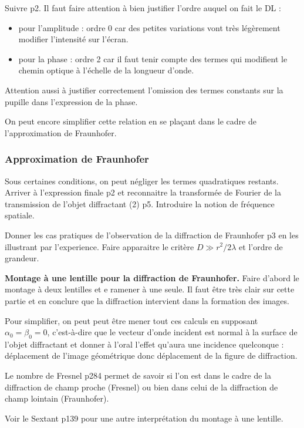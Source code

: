 Suivre \cite{Sayrin2019} p2.
Il faut faire attention à bien justifier l'ordre auquel on fait le DL :
\begin{itemize}
\item pour l'amplitude : ordre 0 car des petites variations vont très légèrement modifier l'intensité sur l'écran.
\item pour la phase : ordre 2 car il faut tenir compte des termes qui modifient le chemin optique à l'échelle de la longueur d'onde.
\end{itemize}
Attention aussi à justifier correctement l'omission des termes constants sur la pupille dans l'expression de la phase.

\begin{transition}
On peut encore simplifier cette relation en se plaçant dans le cadre de l'approximation de Fraunhofer.
\end{transition}

\subsubsection{Approximation de Fraunhofer}

Sous certaines conditions, on peut négliger les termes quadratiques restants.
Arriver à l'expression finale \cite{Sayrin2019} p2 et reconnaitre la transformée de Fourier de la transmission de l'objet diffractant \cite{Sayrin2019} (2) p5.
Introduire la notion de fréquence spatiale.

Donner les cas pratiques de l'observation de la diffraction de Fraunhofer \cite{Sayrin2019} p3 en les illustrant par l'experience.
Faire apparaitre le critère $D\gg r^2/2\lambda$ et l'ordre de grandeur.

\begin{experience}
\textbf{Montage à une lentille pour la diffraction de Fraunhofer.}
Faire d'abord le montage à deux lentilles et e ramener à une seule.
Il faut être très clair sur cette partie et en conclure que la diffraction intervient dans la formation des images.
\end{experience}

\begin{remarque}
Pour simplifier, on peut peut être mener tout ces calculs en supposant $\alpha_0 = \beta_0 = 0$, c'est-à-dire que le vecteur d'onde incident est normal à la surface de l'objet diffractant et donner à l'oral l'effet qu'aura une incidence quelconque : déplacement de l'image géométrique donc déplacement de la figure de diffraction.

\noindent
Le nombre de Fresnel \cite{Fruchart2016} p284 permet de savoir si l'on est dans le cadre de la diffraction de champ proche (Fresnel) ou bien dans celui de la diffraction de champ lointain (Fraunhofer).

\noindent
Voir le Sextant p139 pour une autre interprétation du montage à une lentille.
\end{remarque}

